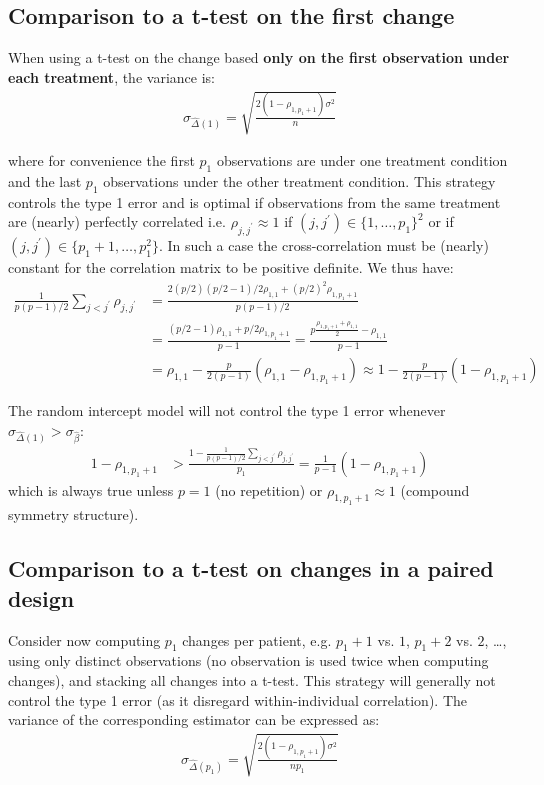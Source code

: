 \documentclass[12pt]{article}
\begin{document}
\subsection{Comparison to a t-test on the first change}
\label{sec:org3d50852}

When using a t-test on the change based \textbf{only on the first observation
under each treatment}, the variance is:
\begin{align*}
\sigma_{\widehat{\Delta}(1)} = \sqrt{\frac{2(1-\rho_{1,p_1+1}) \sigma^2}{n}}
\end{align*}

where for convenience the first \(p_1\) observations are under one
treatment condition and the last \(p_1\) observations under the other
treatment condition. This strategy controls the type 1 error and is
optimal if observations from the same treatment are (nearly) perfectly
correlated i.e. \(\rho_{j,j^{\prime}} \approx 1\) if
\((j,j^{\prime})\in \{1,\ldots,p_1\}^2\) or if \((j,j^{\prime})\in
\{p_1+1,\ldots,p_1^2\}\). In such a case the cross-correlation must be
(nearly) constant for the correlation matrix to be positive
definite. We thus have:
\begin{align*}
\frac{1}{p(p-1)/2}\sum_{j < j^{\prime}} \rho_{j,j^{\prime}} &= \frac{2(p/2)(p/2-1)/2 \rho_{1,1} +(p/2)^2 \rho_{1,p_1+1}}{p(p-1)/2} \\
&= \frac{(p/2-1)\rho_{1,1}+p/2 \rho_{1,p_1+1}}{p-1} = \frac{p\frac{\rho_{1,p_1+1}+\rho_{1,1}}{2} - \rho_{1,1}}{p-1} \\
&= \rho_{1,1} - \frac{p}{2(p-1)}(\rho_{1,1}-\rho_{1,p_1+1}) \approx 1 - \frac{p}{2(p-1)}(1-\rho_{1,p_1+1})
\end{align*}


\noindent The random intercept model will not control the type 1 error
whenever \(\sigma_{\widehat{\Delta}(1)}>\sigma_{\widehat{\beta}}\):
\begin{align*}
1-\rho_{1,p_1+1} &> \frac{1-\frac{1}{p(p-1)/2}\sum_{j < j^{\prime}} \rho_{j,j^{\prime}}}{p_1} = \frac{1}{p-1}(1-\rho_{1,p_1+1})
\end{align*}
which is always true unless \(p=1\) (no repetition) or \(\rho_{1,p_1+1}\approx 1\) (compound symmetry structure).

\subsection{Comparison to a t-test on changes in a paired design}
\label{sec:orge96a8dd}

Consider now computing \(p_1\) changes per patient, e.g. \(p_1+1\)
vs. \(1\), \(p_1+2\) vs. \(2\), \ldots, using only distinct
observations (no observation is used twice when computing changes),
and stacking all changes into a t-test. This strategy will generally
not control the type 1 error (as it disregard within-individual
correlation). The variance of the corresponding estimator can be
expressed as:
\begin{align*}
\sigma_{\widehat{\Delta}(p_1)} = \sqrt{\frac{2(1-\rho_{1,p_1+1}) \sigma^2}{np_1}}
\end{align*}
\end{document}
